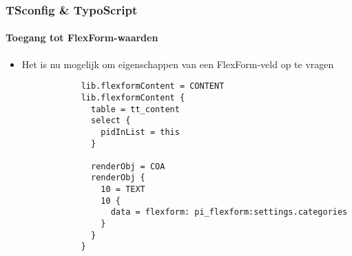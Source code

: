 \begin{frame}[fragile]
	\frametitle{TSconfig \& TypoScript}
	\framesubtitle{Toegang tot FlexForm-waarden}

	\lstset{basicstyle=\tiny\ttfamily}

	\begin{itemize}

		\item Het is nu mogelijk om eigenschappen van een FlexForm-veld op te vragen

		\begin{lstlisting}
			lib.flexformContent = CONTENT
			lib.flexformContent {
			  table = tt_content
			  select {
			    pidInList = this
			  }

			  renderObj = COA
			  renderObj {
			    10 = TEXT
			    10 {
			      data = flexform: pi_flexform:settings.categories
			    }
			  }
			}
		\end{lstlisting}

	\end{itemize}

\end{frame}

